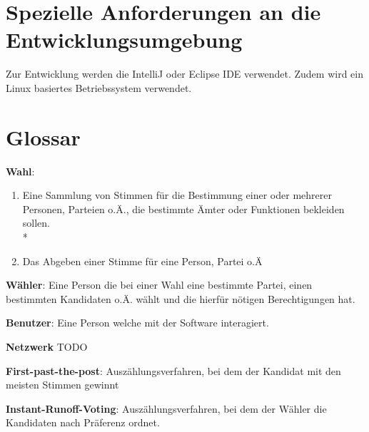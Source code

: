\documentclass[parskip=full,11pt,twoside]{scrartcl}
\begin{document}
\section{Spezielle Anforderungen an die Entwicklungsumgebung}
Zur Entwicklung werden die IntelliJ oder Eclipse IDE verwendet.
Zudem wird ein Linux basiertes Betriebssystem verwendet.

\section{Glossar}

\textbf{Wahl}:
\begin{enumerate}
	\item Eine Sammlung von Stimmen für die Bestimmung einer oder mehrerer Personen, Parteien o.Ä., die bestimmte Ämter oder Funktionen bekleiden sollen. \\*
	\item Das Abgeben einer Stimme für eine Person, Partei o.Ä
\end{enumerate}

\textbf{Wähler}:
Eine Person die bei einer Wahl eine bestimmte Partei, einen bestimmten Kandidaten o.Ä. wählt und die hierfür nötigen Berechtigungen hat.

\textbf{Benutzer}:
Eine Person welche mit der Software interagiert.

\textbf{Netzwerk}
TODO

\textbf{First-past-the-post}:
Auszählungsverfahren, bei dem der Kandidat mit den meisten Stimmen gewinnt

\textbf{Instant-Runoff-Voting}:
Auszählungsverfahren, bei dem der Wähler die Kandidaten nach Präferenz ordnet.
\end{document}
